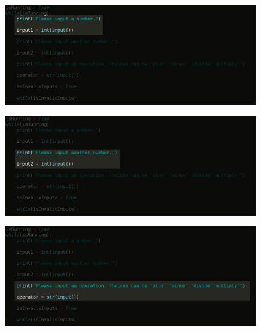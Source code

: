 \documentclass{beamer}
\begin{document}
\begin{frame}
\begin{figure}[h]
\includegraphics[width=0.99\textwidth]{inputsnip2}
\end{figure}
\end{frame}

\begin{frame}
\begin{figure}[h]
\includegraphics[width=0.99\textwidth]{inputsnip3}
\end{figure}
\end{frame}

\begin{frame}
\begin{figure}[h]
\includegraphics[width=0.99\textwidth]{inputsnip4}
\end{figure}
\end{frame}
\end{document}
